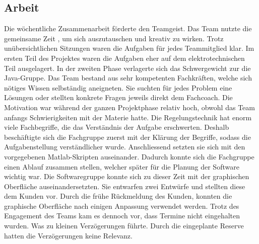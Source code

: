 \subsection{Arbeit}
Die wöchentliche Zusammenarbeit förderte den Teamgeist. Das Team nutzte die gemeinsame Zeit , um sich auszutauschen und kreativ zu wirken. Trotz unübersichtlichen Sitzungen waren die Aufgaben für jedes Teammitglied klar. Im ersten Teil des Projektes waren die Aufgaben eher auf dem elektrotechnischen Teil ausgelagert. In der zweiten Phase verlagerte sich das Schwergewicht zur die Java-Gruppe. Das Team bestand aus sehr kompetenten Fachkräften, welche sich nötiges Wissen selbständig aneigneten. Sie suchten für jedes Problem eine Lösungen oder stellten konkrete Fragen jeweils direkt dem Fachcoach. Die Motivation war während der ganzen Projektphase relativ hoch, obwohl das Team anfangs Schwierigkeiten mit der Materie hatte. 
Die Regelungstechnik hat enorm viele Fachbegriffe, die das Verständnis der Aufgabe erschwerten. Deshalb beschäftigte sich die Fachgruppe zuerst mit der Klärung der Begriffe, sodass die Aufgabenstellung verständlicher wurde. Anschliessend setzten sie sich mit den vorgegebenen Matlab-Skripten auseinander. Dadurch konnte sich die Fachgruppe einen Ablauf zusammen stellen, welcher später für die Planung der Software wichtig war. Die Softwaregruppe konnte sich zu dieser Zeit mit der graphischen Oberfläche auseinandersetzten. Sie entwarfen zwei Entwürfe und stellten diese dem Kunden vor. Durch die frühe Rückmeldung des Kunden, konnten die graphische Oberfläche nach einigen Anpassung  verwendet werden.
Trotz des Engagement des Teams kam es dennoch vor, dass Termine nicht eingehalten wurden. Was zu kleinen Verzögerungen führte. Durch die eingeplante Reserve hatten die Verzögerungen keine Relevanz. 
